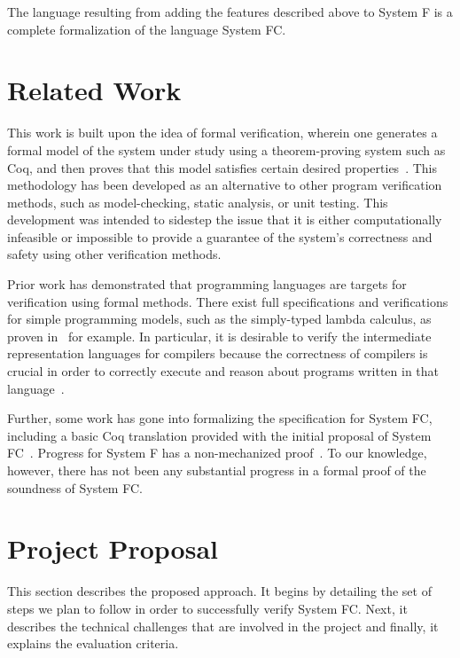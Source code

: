 \documentclass{sig-alternate}
\begin{document}
The language resulting from adding the features described above to System F is a complete formalization of the language System FC. 



\section{Related Work}
\label{sec:related_work}
This work is built upon the idea of formal verification, wherein one generates a formal
model of the system under study using a theorem-proving system such as Coq, and then proves 
that this model satisfies certain desired properties~\cite{series/natosec/CousotC10}. This 
methodology has been developed as an alternative to other program verification methods, such as 
model-checking, static analysis, or unit testing. This development was intended to sidestep the 
issue that it is either computationally infeasible or impossible to provide a guarantee of the 
system's correctness and safety using other verification methods.

Prior work has demonstrated that programming languages are targets for verification using 
formal methods. There exist full specifications and verifications for simple programming
models, such as the simply-typed lambda calculus, as proven in~\cite{Pierce:SF} for example. In particular, it is desirable to verify the intermediate representation languages for compilers because the correctness of compilers is crucial in order to correctly execute and reason about programs written in that language~\cite{Zhao:2012:FLI:2103656.2103709}.

Further, some work has gone into formalizing the specification for System FC, including a basic 
Coq translation provided with the initial proposal of System FC~\cite{conf/tldi/SulzmannCJD07}. 
Progress for System F has a non-mechanized proof~\cite{Girard:1989:PT:64805}. To our knowledge, however, there has not been any substantial progress in a formal 
proof of the soundness of System FC.

\section{Project Proposal}
\label{sec:project_proposal}
This section describes the proposed approach. It begins by detailing the set of steps we plan to follow in order to successfully verify System FC. Next, it describes the technical challenges that are involved in the project and finally, it explains the evaluation criteria.
\end{document}
